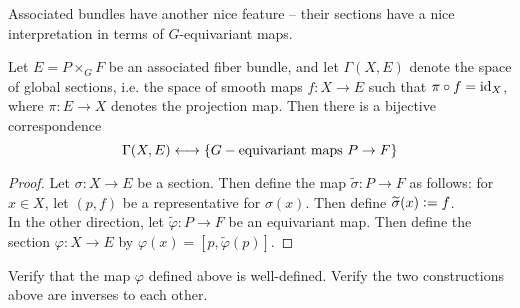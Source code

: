 %
Associated bundles have another nice feature -- their sections have
a nice interpretation in terms of $G$-equivariant maps.
%
\begin{prop}
Let $E = P \times_G F$ be an associated fiber bundle, and let
$\Gamma(X,E)$ denote the space of global sections, i.e. the space of
smooth maps $f : X \to E$ such that $\pi \circ f = \operatorname{id}_X$, where
$\pi : E \to X$ denotes the projection map. Then there is a bijective correspondence
\[
\Gamma(X,E) \longleftrightarrow \left\lbrace G-\text{equivariant maps } P \to F \right\rbrace
\]
\end{prop}
%
\begin{proof}
Let $\sigma : X \to E$ be a section. Then define the map
$\widetilde{\sigma} : P \to F$ as follows: for $x \in X$, let $(p,f)$ be a
representative for $\sigma(x)$. Then define $\widetilde{\sigma}(x) \vcentcolon= f$. \\

In the other direction, let $\widetilde{\varphi} : P \to F$ be an equivariant
map. Then define the section $\varphi : X \to E$ by
$\varphi(x) = [p,\widetilde{\varphi}(p)]$.
\end{proof}
%
\begin{exer}
Verify that the map $\varphi$ defined above is well-defined. Verify the two
constructions above are inverses to each other.
\end{exer}
%